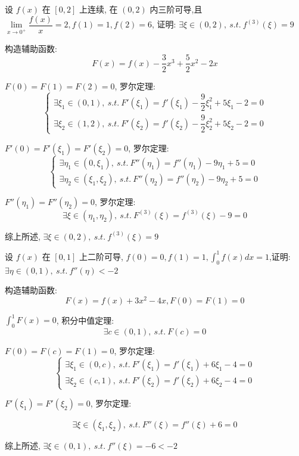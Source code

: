 \begin{proposition}
	设 $f(x)$ 在 $[0,2]$ 上连续, 在 $(0,2)$ 内三阶可导,且 $\lim\limits_{x\rightarrow 0^{+}}\dfrac{f(x)}{x}=2,f(1)=1,f(2)=6$, 证明: $\exists \xi\in(0,2),\ s.t.\ f^{(3)}(\xi)=9$
\end{proposition}
\begin{solution}

	构造辅助函数: 
	$$F(x)=f(x)-\dfrac{3}{2}x^3+\dfrac{5}{2}x^2-2x$$

	$F(0)=F(1)=F(2)=0$, 罗尔定理:
	$$\begin{cases}
		\exists \xi_{1}\in(0,1),\ s.t.\ F'(\xi_{1})=f'(\xi_{1})-\dfrac{9}{2}\xi_{1}^2+5\xi_{1}-2=0 \\
		\exists \xi_{2}\in(1,2),\ s.t.\ F'(\xi_{2})=f'(\xi_{2})-\dfrac{9}{2}\xi_{2}^2+5\xi_{2}-2=0
	\end{cases}$$

	$F'(0) = F'(\xi_{1}) = F'(\xi_{2}) = 0$, 罗尔定理:
	$$\begin{cases}
		\exists \eta_{1}\in(0,\xi_{1}),\ s.t.\ F''(\eta_{1})=f''(\eta_{1})-9\eta_{1}+5=0 \\
		\exists \eta_{2}\in(\xi_{1},\xi_{2}),\ s.t.\ F''(\eta_{2})=f''(\eta_{2})-9\eta_{2}+5=0
	\end{cases}$$

	$F''(\eta_{1}) = F''(\eta_{2}) = 0$, 罗尔定理:
	$$\exists \xi\in(\eta_{1},\eta_{2}),\ s.t.\ F^{(3)}(\xi)=f^{(3)}(\xi)-9=0$$

	综上所述, $\exists \xi\in(0,2),\ s.t.\ f^{(3)}(\xi)=9$
\end{solution}

\begin{proposition}
	设 $f(x)$ 在 $[0,1]$ 上二阶可导, $f(0)=0,f(1)=1,\displaystyle{\int_{0}^{1}f(x)dx=1}$,证明: $\exists \eta\in(0,1),\ s.t.\ f''(\eta)<-2$
\end{proposition}
\begin{solution}

	构造辅助函数: 
	$$F(x)=f(x)+3x^2-4x, F(0) = F(1) = 0$$

	$\displaystyle{\int_{0}^{1}F(x)=0}$, 积分中值定理:
	$$\exists c\in(0,1), \ s.t.\ F(c)=0$$

	$F(0) = F(c) = F(1) = 0$, 罗尔定理:
	$$\begin{cases}
		\exists \xi_{1}\in(0,c),\ s.t.\ F'(\xi_{1})=f'(\xi_{1})+6\xi_{1}-4=0 \\
		\exists \xi_{2}\in(c,1),\ s.t.\ F'(\xi_{2})=f'(\xi_{2})+6\xi_{2}-4=0
	\end{cases}$$

	$F'(\xi_{1}) = F'(\xi_{2}) = 0$, 罗尔定理:

	$$\exists \xi\in(\xi_{1},\xi_{2}),\ s.t.\ F''(\xi)=f''(\xi)+6=0$$

	综上所述, $\exists \xi\in(0,1),\ s.t.\ f''(\xi)=-6<-2$
\end{solution}

